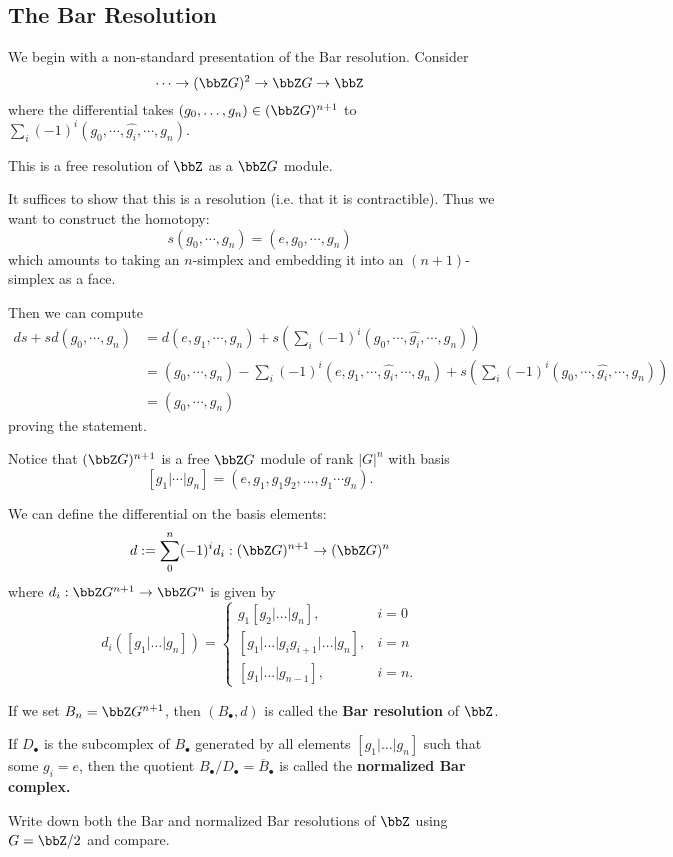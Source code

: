 \documentclass[12pt]{article}
\begin{document}
\subsection{The Bar Resolution}
We begin with a non-standard presentation of the Bar resolution. Consider 
\[\cdots\to (\bbZ G)^2\to \bbZ G\to \bbZ\]
where the differential takes $(g_0,\dots,g_n)\in(\bbZ G)^{n+1}$ to $\sum_i(-1)^i(g_0,\cdots,\widehat{g_i},\cdots,g_n)$.
\begin{prop}
	This is a free resolution of $\bbZ$ as a $\bbZ G$ module.
\end{prop}
\begin{prf}
	It suffices to show that this is a resolution (i.e. that it is contractible). Thus we want to 
	construct the homotopy:
	\[s(g_0,\cdots,g_n)=(e,g_0,\cdots,g_n)\]
	which amounts to taking an $n$-simplex and embedding it into an $(n+1)$-simplex as a face.

	Then we can compute 
	\begin{align*}
		ds+sd(g_0,\cdots,g_n)&=d(e,g_1,\cdots,g_n)+s\left(\sum_i(-1)^i(g_0,\cdots,\widehat{g_i},\cdots,g_n)\right)\\
		&= (g_0,\cdots,g_n)-\sum_{i}(-1)^i(e,g_1,\cdots,\widehat{g_i},\cdots,g_n)+s\left(\sum_i(-1)^i(g_0,\cdots,\widehat{g_i},\cdots,g_n)\right)\\
		&= (g_0,\cdots,g_n)
	\end{align*}
	proving the statement.
\end{prf}
\begin{rmk}
	Notice that $(\bbZ G)^{n+1}$ is a free $\bbZ G$ module of rank $|G|^n$ with basis 
	\[[g_1|\cdots|g_n]=(e,g_1,g_1g_2,\dots,g_1\cdots g_n).\]
\end{rmk}
\begin{rmk}
	We can define the differential on the basis elements:
	\[d:=\sum_0^{n}(-1)^id_i:(\bbZ G)^{n+1}\to(\bbZ G)^n\]
	where $d_i:\bbZ G^{n+1}\to\bbZ G^n$ is given by
	\[d_i([g_1|\dots|g_n])=\left\{\begin{array}{lr}
		g_1[g_2|\dots|g_n],& i=0\\
		\left[g_1|\dots |g_ig_{i+1}|\dots|g_n \right], & i = n\\
		\left[g_1|\dots|g_{n-1}\right], & i = n.
	\end{array}\right.\]
\end{rmk}
\begin{defn}
	If we set $B_n=\bbZ G^{n+1}$, then $(B_\bullet, d)$ is called the \textbf{Bar resolution} of $\bbZ$.
\end{defn}
\begin{defn}
	If $D_\bullet$ is the subcomplex of $B_\bullet$ generated by all elements $[g_1|\dots|g_n]$ such that some $g_i=e$,
	then the quotient $B_\bullet/D_\bullet=\overline{B}_\bullet$ is called the \textbf{normalized Bar complex.}
\end{defn}
\begin{prob}
	Write down both the Bar and normalized Bar resolutions of $\bbZ$ using $G=\bbZ/2$ and compare.
\end{prob}
\end{document}
